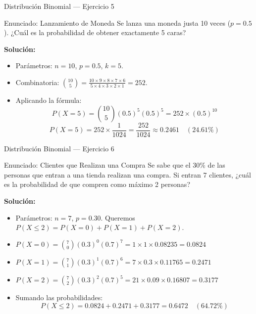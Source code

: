 \documentclass[aspectratio=169, 10pt]{beamer}
\begin{document}
\begin{frame}{Distribución Binomial — Ejercicio 5}
    \begin{exampleblock}{Enunciado: Lanzamiento de Moneda}
        Se lanza una moneda justa 10 veces ($p=0.5$). ¿Cuál es la probabilidad de obtener exactamente 5 caras?
    \end{exampleblock}
        \pause
    \textbf{Solución:}
    \begin{itemize}
        \item Parámetros: $n = 10$, $p = 0.5$, $k = 5$.
        \item Combinatoria: $\binom{10}{5} = \frac{10 \times 9 \times 8 \times 7 \times 6}{5 \times 4 \times 3 \times 2 \times 1} = 252$.
        \item Aplicando la fórmula:
        $$P(X = 5) = \binom{10}{5} (0.5)^5 (0.5)^5 = 252 \times (0.5)^{10}$$
        $$P(X = 5) = 252 \times \frac{1}{1024} = \frac{252}{1024} \approx \mathbf{0.2461} \quad (24.61\%)$$
    \end{itemize}
\end{frame}

\begin{frame}{Distribución Binomial — Ejercicio 6}
    \begin{exampleblock}{Enunciado: Clientes que Realizan una Compra}
        Se sabe que el 30\% de las personas que entran a una tienda realizan una compra. Si entran 7 clientes, ¿cuál es la probabilidad de que compren como máximo 2 personas?
    \end{exampleblock}
        \pause
    \textbf{Solución:}
    \begin{itemize}
        \item Parámetros: $n = 7$, $p = 0.30$. Queremos $P(X \le 2) = P(X=0) + P(X=1) + P(X=2)$.
        \item $P(X=0) = \binom{7}{0} (0.3)^0 (0.7)^7 = 1 \times 1 \times 0.08235 = 0.0824$
        \item $P(X=1) = \binom{7}{1} (0.3)^1 (0.7)^6 = 7 \times 0.3 \times 0.11765 = 0.2471$
        \item $P(X=2) = \binom{7}{2} (0.3)^2 (0.7)^5 = 21 \times 0.09 \times 0.16807 = 0.3177$
        \item Sumando las probabilidades:
        $$P(X \le 2) = 0.0824 + 0.2471 + 0.3177 = \mathbf{0.6472} \quad (64.72\%)$$
    \end{itemize}
\end{frame}

\end{document}
